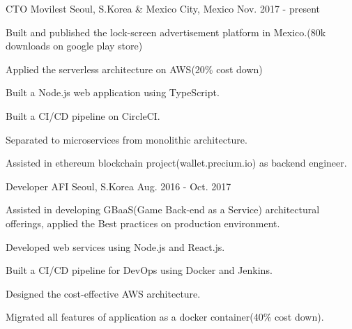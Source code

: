 

\begin{cventries}

  \cventry
    {CTO} %
    {Movilest} %
    {Seoul, S.Korea \& Mexico City, Mexico} %
    {Nov. 2017 - present} %
    {
      \begin{cvitems} %
        \item {Built and published the lock-screen advertisement platform in Mexico.(80k downloads on google play store)}
        \item {Applied the serverless architecture on AWS(20\% cost down)}
        \item {Built a Node.js web application using TypeScript.}
        \item {Built a CI/CD pipeline on CircleCI.}
        \item {Separated to microservices from monolithic architecture.}
        \item {Assisted in ethereum blockchain project(wallet.precium.io) as backend engineer.}
      \end{cvitems}
    }

  \cventry
    {Developer} %
    {AFI} %
    {Seoul, S.Korea} %
    {Aug. 2016 - Oct. 2017} %
    {
      \begin{cvitems} %
        \item {Assisted in developing GBaaS(Game Back-end as a Service) architectural offerings, applied the Best practices on production environment.}
        \item {Developed web services using Node.js and React.js.}
        \item {Built a CI/CD pipeline for DevOps using Docker and Jenkins.}
        \item {Designed the cost-effective AWS architecture.}
        \item {Migrated all features of application as a docker container(40\% cost down).}
      \end{cvitems}
    }

\end{cventries}
